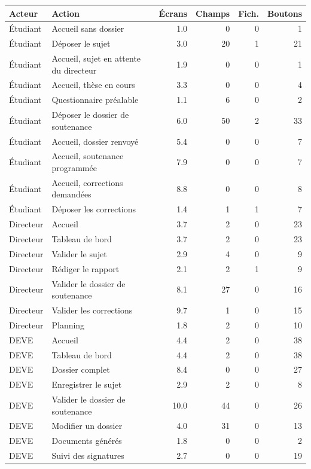 \documentclass[11pt,a4paper]{article}
\begin{document}
\begin{small}
\begin{longtable}{@{}p{3.1cm} p{6.4cm} r r r r@{}}
\toprule
\textbf{Acteur} & \textbf{Action} & \textbf{Écrans} & \textbf{Champs} & \textbf{Fich.} & \textbf{Boutons} \\
\midrule
\endhead
Étudiant & Accueil sans dossier & 1.0 & 0 & 0 & 1 \\
Étudiant & Déposer le sujet & 3.0 & 20 & 1 & 21 \\
Étudiant & Accueil, sujet en attente du directeur & 1.9 & 0 & 0 & 1 \\
Étudiant & Accueil, thèse en cours & 3.3 & 0 & 0 & 4 \\
Étudiant & Questionnaire préalable & 1.1 & 6 & 0 & 2 \\
Étudiant & Déposer le dossier de soutenance & 6.0 & 50 & 2 & 33 \\
Étudiant & Accueil, dossier renvoyé & 5.4 & 0 & 0 & 7 \\
Étudiant & Accueil, soutenance programmée & 7.9 & 0 & 0 & 7 \\
Étudiant & Accueil, corrections demandées & 8.8 & 0 & 0 & 8 \\
Étudiant & Déposer les corrections & 1.4 & 1 & 1 & 7 \\
Directeur & Accueil & 3.7 & 2 & 0 & 23 \\
Directeur & Tableau de bord & 3.7 & 2 & 0 & 23 \\
Directeur & Valider le sujet & 2.9 & 4 & 0 & 9 \\
Directeur & Rédiger le rapport & 2.1 & 2 & 1 & 9 \\
Directeur & Valider le dossier de soutenance & 8.1 & 27 & 0 & 16 \\
Directeur & Valider les corrections & 9.7 & 1 & 0 & 15 \\
Directeur & Planning & 1.8 & 2 & 0 & 10 \\
DEVE & Accueil & 4.4 & 2 & 0 & 38 \\
DEVE & Tableau de bord & 4.4 & 2 & 0 & 38 \\
DEVE & Dossier complet & 8.4 & 0 & 0 & 27 \\
DEVE & Enregistrer le sujet & 2.9 & 2 & 0 & 8 \\
DEVE & Valider le dossier de soutenance & 10.0 & 44 & 0 & 26 \\
DEVE & Modifier un dossier & 4.0 & 31 & 0 & 13 \\
DEVE & Documents générés & 1.8 & 0 & 0 & 2 \\
DEVE & Suivi des signatures & 2.7 & 0 & 0 & 19 \\

\end{longtable}
\end{small}
\end{document}
